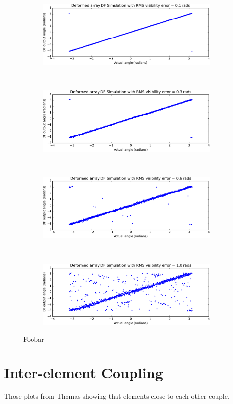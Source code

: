 \begin{figure}
  \begin{subfigure}{\textwidth}
    \centering
    \includegraphics[height=0.23\textheight]{df-simulation-deformed-0-1}
  \end{subfigure}\\[1em]
  \begin{subfigure}{\textwidth}
    \centering
    \includegraphics[height=0.23\textheight]{df-simulation-deformed-0-3}
  \end{subfigure}\\[1em]
  \begin{subfigure}{\textwidth}
    \centering
    \includegraphics[height=0.23\textheight]{df-simulation-deformed-0-6}
  \end{subfigure}\\[1em]
  \begin{subfigure}{\textwidth}
    \centering
    \includegraphics[height=0.23\textheight]{df-simulation-deformed-1-0}
  \end{subfigure}
  \caption{Foobar}
\end{figure}

\section{Inter-element Coupling}
Those plots from Thomas showing that elements close to each other couple.

